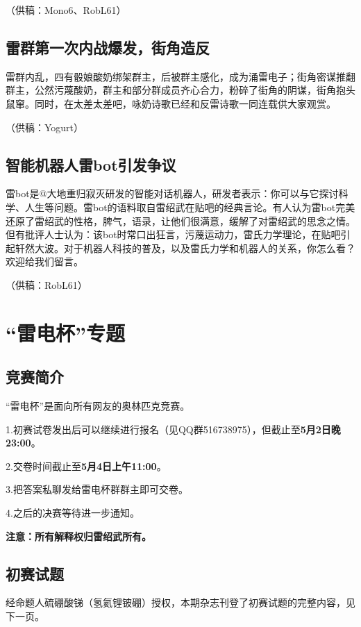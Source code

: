 \documentclass[UTF8,12pt,oneside]{ctexbook}
\begin{document}
        \hfill（供稿：Mono6、RobL61）
        
        \normalsize
        
        \newpage
        
        \section{雷群第一次内战爆发，街角造反}
        雷群内乱，四有骰娘酸奶绑架群主，后被群主感化，成为涌雷电子；街角密谋推翻群主，公然污蔑酸奶，群主和部分群成员齐心合力，粉碎了街角的阴谋，街角抱头鼠窜。同时，在太差太差吧，咏奶诗歌已经和反雷诗歌一同连载供大家观赏。
        
        \hfill（供稿：Yogurt）
        
        \section{智能机器人雷bot引发争议}
        雷bot是@大地重归寂灭研发的智能对话机器人，研发者表示：你可以与它探讨科学、人生等问题。雷bot的语料取自雷绍武在贴吧的经典言论。有人认为雷bot完美还原了雷绍武的性格，脾气，语录，让他们很满意，缓解了对雷绍武的思念之情。但有批评人士认为：该bot时常口出狂言，污蔑运动力，雷氏力学理论，在贴吧引起轩然大波。对于机器人科技的普及，以及雷氏力学和机器人的关系，你怎么看？欢迎给我们留言。
        
        \hfill（供稿：RobL61）
        
    \chapter{“雷电杯”专题}
        \section{竞赛简介}
        \large
        “雷电杯”是面向所有网友的奥林匹克竞赛。
        
        1.初赛试卷发出后可以继续进行报名（见QQ群516738975），但截止至\textbf{5月2日晚23:00}。
        
        2.交卷时间截止至\textbf{5月4日上午11:00}。
        
        3.把答案私聊发给雷电杯群群主即可交卷。
        
        4.之后的决赛等待进一步通知。
        
        \textbf{注意：所有解释权归雷绍武所有。}
        
        \section{初赛试题}
        经命题人硫硼酸锑（氢氦锂铍硼）授权，本期杂志刊登了初赛试题的完整内容，见下一页。
    
\end{document}

